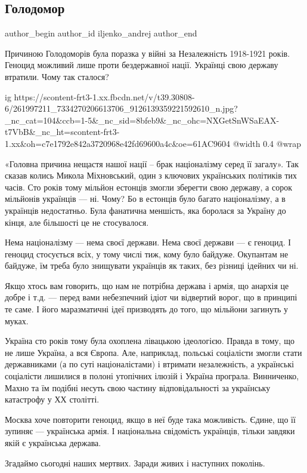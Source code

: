  
 
 
 
 
 
\subsection{Голодомор}
\label{sec:27_11_2021.fb.iljenko_andrej.1.golodomor}
 
\ifcmt
 author_begin
   author_id iljenko_andrej
 author_end
\fi

Причиною Голодоморів була поразка у війні за Незалежність 1918-1921 років.
Геноцид можливий лише проти бездержавної нації. Українці свою державу втратили.
Чому так сталося?

\ifcmt
  ig https://scontent-frt3-1.xx.fbcdn.net/v/t39.30808-6/261997211_7334270206613706_9126139359221592610_n.jpg?_nc_cat=104&ccb=1-5&_nc_sid=8bfeb9&_nc_ohc=NXGetSnWSaEAX-t7VbB&_nc_ht=scontent-frt3-1.xx&oh=c7e1792e842a3720968e42fd69600a4c&oe=61AC9604
  @width 0.4
  @wrap 
\fi

«Головна причина нещастя нашої нації – брак націоналізму серед її загалу». Так
сказав колись Микола Міхновський, один з ключових українських політиків тих
часів. Сто років тому мільйон естонців змогли зберегти свою державу, а сорок
мільйонів українців — ні. Чому? Бо в естонців було багато націоналізму, а в
українців недостатньо. Була фанатична меншість, яка боролася за Україну до
кінця, але більшості це не стосувалося. 

Нема націоналізму — нема своєї держави. Нема своєї держави — є геноцид. І
геноцид стосується всіх, у тому числі тиж, кому було байдуже. Окупантам не
байдуже, їм треба було знищувати українців як таких, без різниці ідейних чи ні.

Якщо хтось вам говорить, що нам не потрібна держава і армія, що анархія це
добре і т.д. — перед вами небезпечний ідіот чи відвертий ворог, що в принципі
те саме. І його маразматичні ідеї призводять до того, що мільйони загинуть у
муках. 

Україна сто років тому була охоплена лівацькою ідеологією. Правда в тому, що не
лише Україна, а вся Європа. Але, наприклад, польські соціалісти змогли стати
державниками (а по суті націоналістами) і втримати незалежність, а українські
соціалісти лишилися в полоні утопічних ілюзій і Україна програла. Винниченко,
Махно та їм подібні несуть свою частину відповідальності за українську
катастрофу у ХХ столітті. 

Москва хоче повторити геноцид, якщо в неї буде така можливість. Єдине, що її
зупиняє — українська армія. І національна свідомість українців, тільки завдяки
якій є українська держава. 

Згадаймо сьогодні наших мертвих. Заради живих і наступних поколінь.

